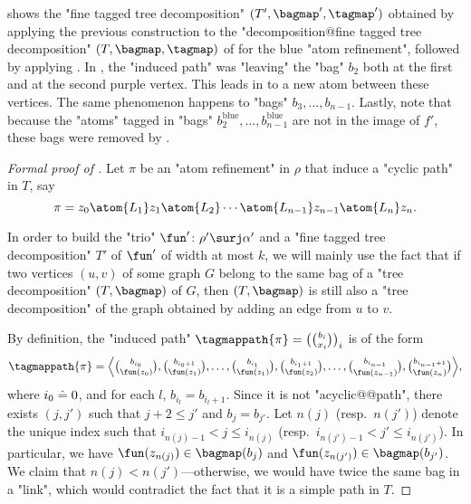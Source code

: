  shows the "fine tagged tree decomposition" $(T',\bagmap',\tagmap')$
obtained by applying the previous construction to the "decomposition@fine tagged tree decomposition"
$(T, \bagmap, \tagmap)$ of  for the blue "atom refinement",
followed by applying .
In , the "induced path" was "leaving" the "bag" $b_2$ both
at the first and at the second purple vertex. This leads in 
to a new atom between these vertices. The same phenomenon happens to "bags" $b_3, \hdots, b_{n-1}$.
Lastly, note that because the "atoms" tagged in "bags"
$b^{\text{blue}}_2, \hdots, b^{\text{blue}}_{n-1}$ are not in the image of $f'$,
these bags were removed by .

\begin{proof}[Formal proof of ]
    Let $\pi$ be an "atom refinement" in $\rho$ that induce a "cyclic path" in $T$,
    say
    \[
      \pi = z_0 \atom{L_1} z_1 \atom{L_2} \dotsb \atom{L_{n-1}} z_{n-1} \atom{L_n} z_n.
    \]

    In order to build the "trio" $\fun'\colon \rho' \surj \alpha'$
    and a "fine tagged tree decomposition" $T'$ of $\fun'$ of width at most $k$,
    we will mainly use the fact that if two vertices $(u,v)$ of some graph $G$
    belong to the same bag of a "tree decomposition" $(T, \bagmap)$ of $G$, then
    $(T, \bagmap)$ is still also a "tree decomposition" of the graph obtained by adding an edge from $u$ to $v$.
    
    By definition, the "induced path" $\tagmappath{\pi} = \bigl({b_i \choose x_i}\bigr)_i$
	is of the form
    \[
        \tagmappath{\pi} =
        \textstyle{
        \Bigl\langle
            {b_{i_0} \choose \fun(z_0)},
			{b_{i_0+1} \choose \fun(z_1)},
			\hdots,
			{b_{i_1} \choose \fun(z_1)},
			{b_{i_1+1} \choose \fun(z_2)},
			\hdots,
			{b_{i_{n-1}} \choose \fun(z_{n-1})},
			{b_{i_{n-1}+1} \choose \fun(z_n)}
        \Bigr\rangle
        },
    \]
	where $i_0 \mathrel{\hat{=}} 0$, and for each $l$, $b_{i_l} = b_{i_l+1}$.
    Since it is not "acyclic@@path", there exists $(j, j')$ such that
    $j + 2 \leq  j'$ and $b_j = b_{j'}$.
    Let $n(j)$ (resp.\ $n(j')$) denote the unique index such that
    $i_{n(j)-1} < j \leq i_{n(j)}$ (resp.\ $i_{n(j')-1} < j' \leq i_{n(j')}$).
    In particular, we have $\fun(z_{n(j)}) \in \bagmap(b_j)$
    and $\fun(z_{n(j')}) \in \bagmap(b_{j'})$.
    We claim that $n(j) < n(j')$---otherwise, we would have twice the same
	bag in a "link", which would contradict the fact that it is a simple path in $T$.
  

\end{proof}
